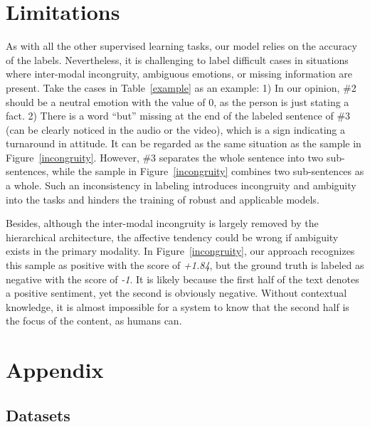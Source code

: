 \documentclass[11pt,a4paper]{article}
\begin{document}
\section*{Limitations}
As with all the other supervised learning tasks, our model relies on the accuracy of the labels. Nevertheless, it is challenging to label difficult cases in situations where inter-modal incongruity, ambiguous emotions, or missing information are present. Take the cases in Table~\ref{example} as an example: 1) In our opinion, \#2 should be a neutral emotion with the value of 0, as the person is just stating a fact. 2) There is a word ``but'' missing at the end of the labeled sentence of \#3 (can be clearly noticed in the audio or the video), which is a sign indicating a turnaround in attitude. It can be regarded as the same situation as the sample in Figure~\ref{incongruity}. However, \#3 separates the whole sentence into two sub-sentences, while the sample in Figure~\ref{incongruity} combines two sub-sentences as a whole. Such an inconsistency in labeling introduces incongruity and ambiguity into the tasks and hinders the training of robust and applicable models.

Besides, although the inter-modal incongruity is largely removed by the hierarchical architecture, the affective tendency could be wrong if ambiguity exists in the primary modality. In Figure~\ref{incongruity}, our approach recognizes this sample as positive with the score of \textit{+1.84}, but the ground truth is labeled as negative with the score of \textit{-1}. It is likely because the first half of the text denotes a positive sentiment, yet the second is obviously negative. Without contextual knowledge, it is almost impossible for a system to know that the second half is the focus of the content, as humans can.




\appendix

\section{Appendix}
\label{sec:appendix}

\subsection{Datasets}
\begin{table}[!ht]
\caption{Data distribution and modality sampling rate of CMU-MOSI and CMU-MOSEI. {$S_{A}$} for audio sampling rate and {$S_{V}$} for vision sampling rate.}
\centering
{}
\label{table.1}
\end{table}
\end{document}
